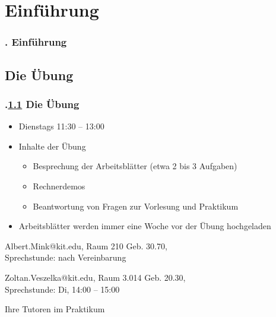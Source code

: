 \section{Einführung}
\begin{frame}
  \frametitle{\kap. Einführung}%
\tableofcontents[current]
\end{frame}


\def\stitle{Die \"Ubung}%
\subsection{\stitle}\label{S:Uebersicht}
\begin{frame}[fragile]%
  \frametitle{\kap.\ref{S:Uebersicht} \stitle}%
\medskip

\begin{itemize}
  \item Dienstags 11:30 -- 13:00
  \item Inhalte der \"Ubung
  \begin{itemize}
    \item Besprechung der Arbeitsbl\"atter (etwa 2 bis 3 Aufgaben)
    \item Rechnerdemos
    \item Beantwortung von Fragen zur Vorlesung und Praktikum
  \end{itemize}
  \item Arbeitsbl\"atter werden immer eine Woche vor der \"Ubung hochgeladen
\end{itemize}
\medskip

\begin{description}[leftmargin=*,style=nextline]
  \item[\textcolor{black}{\textbf{Ansprechpartner}}]
  \item[\"Ubung] Albert.Mink@kit.edu, Raum 210 Geb. 30.70,\\ Sprechstunde: nach Vereinbarung
  \item[\"Ubung und Praktikum] Zoltan.Veszelka@kit.edu, Raum 3.014 Geb. 20.30,\\ Sprechstunde: Di, 14:00 -- 15:00
  \item[Praktikum] Ihre Tutoren im Praktikum
\end{description}
\end{frame}



